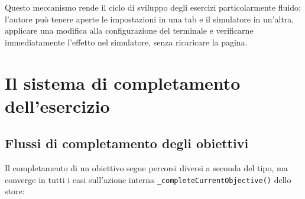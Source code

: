 Questo meccanismo rende il ciclo di sviluppo degli esercizi particolarmente fluido: l'autore può tenere aperte le impostazioni in una tab e il simulatore in un'altra, applicare una modifica alla configurazione del terminale e verificarne immediatamente l'effetto nel simulatore, senza ricaricare la pagina.


\section{Il sistema di completamento dell'esercizio}
\label{sec:completamento}

\subsection{Flussi di completamento degli obiettivi}
\label{subsec:flussi-completamento}

Il completamento di un obiettivo segue percorsi diversi a seconda del tipo, ma converge in tutti i casi sull'azione interna \texttt{\_completeCurrentObjective()} dello store:

